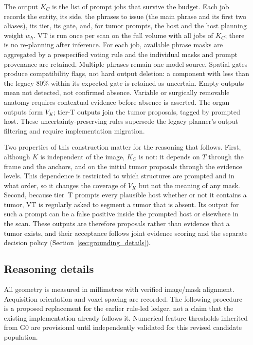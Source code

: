 \documentclass[fleqn,10pt]{olplainarticle}
\begin{document}
The output $K_C$ is the list of prompt jobs that survive the budget. Each job records the entity, its side, the phrases to
issue (the main phrase and its first two aliases), its tier, its gate, and, for tumor prompts, the host and the host
planning weight $w_h$. VT is run once per scan on the full volume with all jobs of $K_C$; there is no re-planning after inference.
For each job, available phrase masks are aggregated by a prespecified voting rule and the individual masks and prompt
provenance are retained. Multiple phrases remain one model source. Spatial gates produce compatibility flags, not hard
output deletion: a component with less than the legacy $80\%$ within its expected gate is retained as uncertain. Empty
outputs mean not detected, not confirmed absence. Variable or surgically removable anatomy requires contextual evidence
before absence is asserted. The organ outputs form $V_K$; tier-T outputs join the tumor proposals, tagged by prompted host.
These uncertainty-preserving rules supersede the legacy planner's output filtering and require implementation migration.

Two properties of this construction matter for the reasoning that follows. First, although $K$ is independent of the
image, $K_C$ is not: it depends on $T$ through the frame and the anchors, and on the initial tumor proposals through the
evidence levels. This dependence is restricted to which structures are prompted and in what order, so it changes the
coverage of $V_K$ but not the meaning of any mask. Second, because tier~T prompts every plausible host whether or not it
contains a tumor, VT is regularly asked to segment a tumor that is absent. Its output for such a prompt can be a false
positive inside the prompted host or elsewhere in the scan. These outputs are therefore proposals rather than evidence that a tumor exists, and
their acceptance follows joint evidence scoring and the separate decision policy
(Section~\ref{sec:grounding_details}).

\subsection{Reasoning details}
\label{sec:reasoning_details}

All geometry is measured in millimetres with verified image/mask alignment. Acquisition orientation and voxel spacing are
recorded. The following procedure is a proposed replacement for the earlier rule-led ledger, not a claim that the existing
implementation already follows it. Numerical feature thresholds inherited from G0 are provisional until independently
validated for this revised candidate population.
\end{document}

